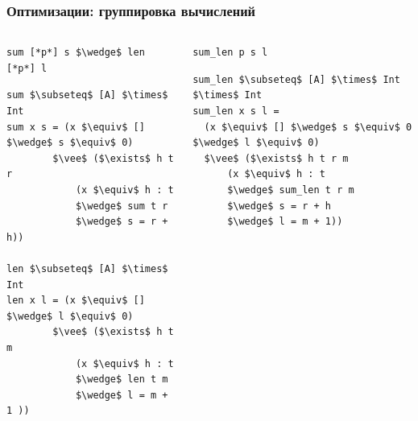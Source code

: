 \documentclass{beamer}
\begin{document}
\begin{frame}[fragile]
  \transwipe[direction=90]
  \frametitle{Оптимизации: группировка вычислений}

\begin{columns} 
\begin{column}{6cm}
\begin{badcode}  
\begin{lstlisting}[frame=single]      
sum [*p*] s $\wedge$ len [*p*] l
\end{lstlisting}

\begin{lstlisting}[frame=single]  
sum $\subseteq$ [A] $\times$ Int
sum x s = (x $\equiv$ [] $\wedge$ s $\equiv$ 0)
        $\vee$ ($\exists$ h t r
            (x $\equiv$ h : t 
            $\wedge$ sum t r
            $\wedge$ s = r + h))
 
len $\subseteq$ [A] $\times$ Int
len x l = (x $\equiv$ [] $\wedge$ l $\equiv$ 0)
        $\vee$ ($\exists$ h t m 
            (x $\equiv$ h : t 
            $\wedge$ len t m
            $\wedge$ l = m + 1 ))
\end{lstlisting}
\end{badcode}
\end{column}

\pause

\begin{column}{6cm}
\begin{goodcode}
\begin{lstlisting}[frame=single]      
sum_len p s l
\end{lstlisting}

\begin{lstlisting}[frame=single]  
sum_len $\subseteq$ [A] $\times$ Int $\times$ Int
sum_len x s l = 
  (x $\equiv$ [] $\wedge$ s $\equiv$ 0 $\wedge$ l $\equiv$ 0)
  $\vee$ ($\exists$ h t r m
      (x $\equiv$ h : t 
      $\wedge$ sum_len t r m
      $\wedge$ s = r + h
      $\wedge$ l = m + 1))
\end{lstlisting}
\end{goodcode}
\end{column}
\end{columns}
\end{frame}
\end{document}
